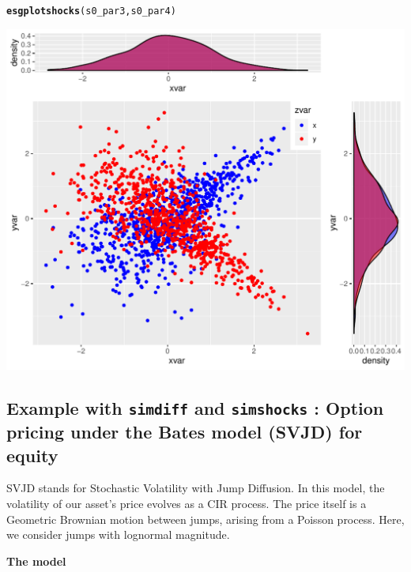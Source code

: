 \documentclass[a4paper]{article}\usepackage[]{graphicx}\usepackage[]{color}
\makeatletter
\def\maxwidth{ %
  \ifdim\Gin@nat@width>\linewidth
    \linewidth
  \else
    \Gin@nat@width
  \fi
}
\newcommand{\hlstd}[1]{\textcolor[rgb]{0.345,0.345,0.345}{#1}}%
\newcommand{\hlkwd}[1]{\textcolor[rgb]{0.737,0.353,0.396}{\textbf{#1}}}%
\newenvironment{kframe}{%
 \def\at@end@of@kframe{}%
 \ifinner\ifhmode%
  \def\at@end@of@kframe{\end{minipage}}%
  \begin{minipage}{\columnwidth}%
 \fi\fi%
 \def\FrameCommand##1{\hskip\@totalleftmargin \hskip-\fboxsep
 \colorbox{shadecolor}{##1}\hskip-\fboxsep
     \hskip-\linewidth \hskip-\@totalleftmargin \hskip\columnwidth}%
 \MakeFramed {\advance\hsize-\width
   \@totalleftmargin\z@ \linewidth\hsize
   \@setminipage}}%
 {\par\unskip\endMakeFramed%
 \at@end@of@kframe}
\newenvironment{knitrout}{}{} %
\newcommand{\code}[1]{\mbox{\texttt{#1}}}
\makeatother
\begin{document}
\begin{knitrout}
\color{fgcolor}\begin{kframe}
\begin{alltt}
\hlkwd{esgplotshocks}\hlstd{(s0_par3, s0_par4)}
\end{alltt}
\end{kframe}

{\centering \includegraphics[width=\maxwidth]{figure/example_simshocks_5-1} 

}



\end{knitrout}

\newpage

\subsection{Example with \code{simdiff} and \code{simshocks} : Option pricing under the  Bates model (SVJD) for equity}
\label{sec:examplesimulation}

SVJD stands for Stochastic Volatility with Jump Diffusion. In this model, the volatility of our asset's price evolves as a CIR process. The price itself is a Geometric Brownian motion between jumps, arising from a Poisson process. Here, we consider jumps with lognormal magnitude.  

\medskip

{\bf The model}
\end{document}
